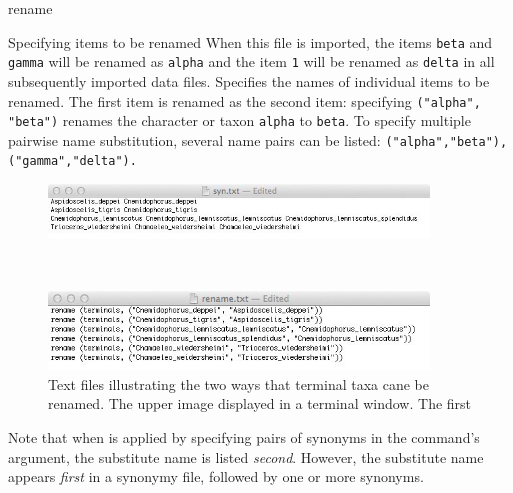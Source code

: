 \begin{command}{rename}{}
\begin{arguments}
\begin{argumentgroup}{Specifying items to be renamed}
{                 When this file is imported, the items \texttt{beta} and \texttt{gamma} will be
                 renamed as \texttt{alpha} and the item \texttt{1} will be renamed as \texttt{delta}
                 in all subsequently imported data files.}
                {}
                {Specifies the names of individual items to be renamed. The first item is renamed
                as the second item: specifying \texttt{("alpha",\\"beta")} renames the character or taxon
                \texttt{alpha} to \texttt{beta}. To specify multiple pairwise name substitution, several 
                name pairs can be listed: \texttt{("alpha","beta"),("gamma","delta").}}
                {}
            \\    
\begin{figure}[th!]
    \begin{center}
        \includegraphics[width=0.9\textwidth]{doc/figures/syn.jpg}
    \end{center}
    \label{fig:syn}
\end{figure}
\,
\begin{figure}[th!]
    \begin{center}
        \includegraphics[width=0.9\textwidth]{doc/figures/rename.jpg}
    \end{center}
    \caption{Text files illustrating the two ways that terminal taxa cane be renamed.  The upper image  displayed in a terminal window. The first }
    \label{fig:rename}
\end{figure}

                \begin{statement}
                Note that when  is applied by specifying pairs of
                 synonyms in the command's argument,
                the substitute name is listed \emph{second}. However,  the substitute name 
                appears \emph{first} in a synonymy file, followed by one or more synonyms.
                \end{statement}
	      \end{argumentgroup}
	      

\end{arguments}
\end{command}
